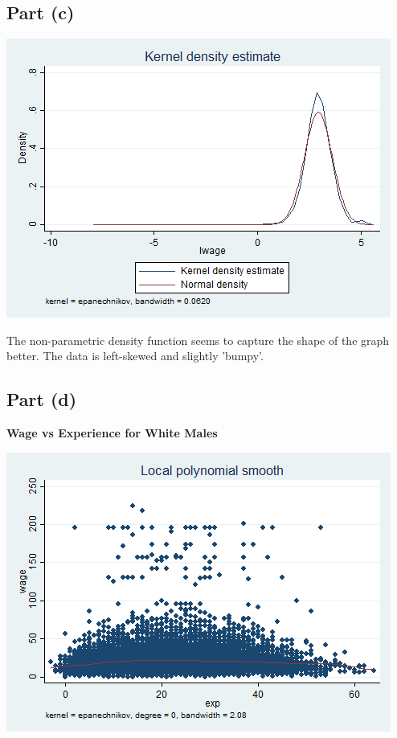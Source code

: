 \documentclass{article}
\begin{document}
\subsection{Part (c)}

\begin{center}
    \includegraphics[scale=.6]{../plots/q4_graph2}
\end{center}

The non-parametric density function seems to capture the shape of the graph better. The data is left-skewed and slightly 'bumpy'.

\subsection{Part (d)}

\begin{center}
	\centering
    \textbf{Wage vs Experience for White Males}\par\medskip
    \includegraphics[scale=.6]{../plots/q4_graph3}
\end{center}
\end{document}
